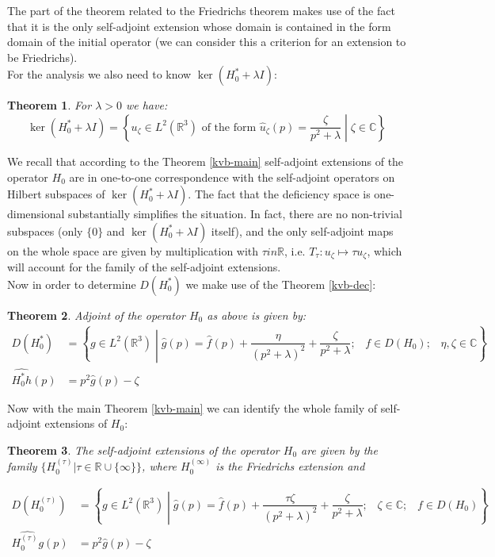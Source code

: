 \documentclass[11pt, a4paper, german]{article}
\theoremstyle{plain}
\newtheorem{theorem}{Theorem}
\theoremstyle{definition}
\theoremstyle{remark}
\numberwithin{equation}{section}
\numberwithin{theorem}{section}
\begin{document}
The part of the theorem related to the Friedrichs theorem makes use of the fact that it is the only self-adjoint extension whose domain is contained in the form domain of the initial operator (we can consider this a criterion for an extension to be Friedrichs).\\

For the analysis we also need to know $\ker (H^*_0 + \lambda I)$:

\begin{theorem}
For $\lambda > 0$ we have:
\begin{equation}
\ker (H^*_0 + \lambda I) = \left\{ u_\zeta \in L^2(\mathbb R^3) \text{ of the form } \widehat{u}_\zeta (p) = \dfrac{\zeta}{p^2+\lambda} \middle| \zeta \in \mathbb C \right\}
\end{equation}
\end{theorem}

We recall that according to the Theorem \ref{kvb-main} self-adjoint extensions of the operator $H_0$ are in one-to-one correspondence with the self-adjoint operators on Hilbert subspaces of $\ker (H^*_0 + \lambda I)$. The fact that the deficiency space is one-dimensional substantially simplifies the situation. In fact, there are no non-trivial subspaces (only $\{0\}$ and $\ker (H^*_0 + \lambda I)$ itself), and the only self-adjoint maps on the whole space are given by multiplication with $\tau in \mathbb R$, i.e. $T_\tau: u_\zeta \mapsto \tau u _\zeta$, which will account for the family of the self-adjoint extensions.\\

Now in order to determine $D(H^*_0)$ we make use of the Theorem \ref{kvb-dec}:

\begin{theorem}
Adjoint of the operator $H_0$ as above is given by:
\begin{align*}
D(H_0^*) &= \left\{g\in L^2(\mathbb R ^3) \middle| \widehat g (p) = \widehat f (p) + \dfrac{\eta}{(p^2+\lambda)^2} + \dfrac{\zeta}{p^2 + \lambda}; \,\,\,\,\, f \in D(H_0); \,\,\,\,\, \eta, \zeta \in \mathbb C\right\}\\
\widehat{H_0^* h}(p) &= p^2\widehat g(p) - \zeta
\end{align*}
\end{theorem}

Now with the main Theorem \ref{kvb-main} we can identify the whole family of self-adjoint extensions of $H_0$:

\begin{theorem}
The self-adjoint extensions of the operator $H_0$ are given by the family $\{H_0^{(\tau)}|\tau \in \mathbb R \cup \{\infty\}\}$, where $H_0^{(\infty)}$ is the Friedrichs extension and

\begin{align*}
D(H^{(\tau)}_0)&=\left\{g \in L^2(\mathbb R ^3) \middle| \widehat g (p) = \widehat f (p) + \dfrac{\tau \zeta}{(p^2+\lambda)^2} + \dfrac{\zeta}{p^2 + \lambda}; \,\,\,\,\, \zeta \in \mathbb C; \,\,\,\,\, f \in D(H_0)\right\}\\
\widehat{H^{(\tau)}_0 g}(p) &= p^2\widehat g (p) - \zeta
\end{align*}
\end{theorem}
\end{document}
